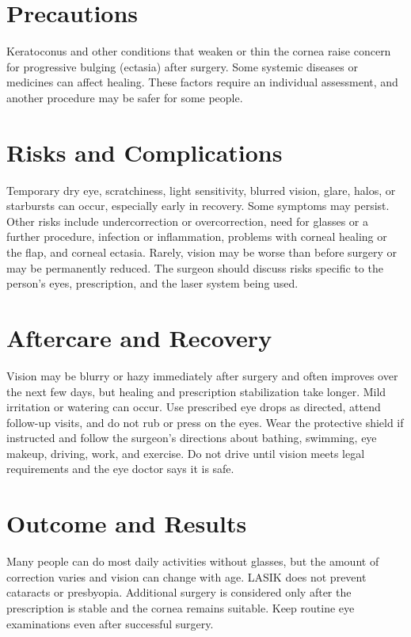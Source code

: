 \section*{Precautions}
Keratoconus and other conditions that weaken or thin the cornea raise concern for progressive bulging (ectasia) after surgery. Some systemic diseases or medicines can affect healing. These factors require an individual assessment, and another procedure may be safer for some people.

\section*{Risks and Complications}
Temporary dry eye, scratchiness, light sensitivity, blurred vision, glare, halos, or starbursts can occur, especially early in recovery. Some symptoms may persist. Other risks include undercorrection or overcorrection, need for glasses or a further procedure, infection or inflammation, problems with corneal healing or the flap, and corneal ectasia. Rarely, vision may be worse than before surgery or may be permanently reduced. The surgeon should discuss risks specific to the person's eyes, prescription, and the laser system being used.

\section*{Aftercare and Recovery}
Vision may be blurry or hazy immediately after surgery and often improves over the next few days, but healing and prescription stabilization take longer. Mild irritation or watering can occur. Use prescribed eye drops as directed, attend follow-up visits, and do not rub or press on the eyes. Wear the protective shield if instructed and follow the surgeon's directions about bathing, swimming, eye makeup, driving, work, and exercise. Do not drive until vision meets legal requirements and the eye doctor says it is safe.

\section*{Outcome and Results}
Many people can do most daily activities without glasses, but the amount of correction varies and vision can change with age. LASIK does not prevent cataracts or presbyopia. Additional surgery is considered only after the prescription is stable and the cornea remains suitable. Keep routine eye examinations even after successful surgery.

